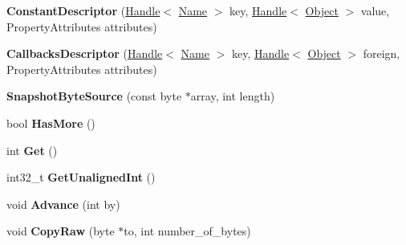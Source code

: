 \begin{DoxyCompactItemize}
\item 
\hypertarget{classv8_1_1internal_1_1_v8___f_i_n_a_l_ae0c2c99fa4e5b13e8497802393c25382}{}{\bfseries Constant\+Descriptor} (\hyperlink{classv8_1_1internal_1_1_handle}{Handle}$<$ \hyperlink{classv8_1_1internal_1_1_name}{Name} $>$ key, \hyperlink{classv8_1_1internal_1_1_handle}{Handle}$<$ \hyperlink{classv8_1_1internal_1_1_object}{Object} $>$ value, Property\+Attributes attributes)\label{classv8_1_1internal_1_1_v8___f_i_n_a_l_ae0c2c99fa4e5b13e8497802393c25382}

\item 
\hypertarget{classv8_1_1internal_1_1_v8___f_i_n_a_l_a8929d30570108eec8403c4b3769fb169}{}{\bfseries Callbacks\+Descriptor} (\hyperlink{classv8_1_1internal_1_1_handle}{Handle}$<$ \hyperlink{classv8_1_1internal_1_1_name}{Name} $>$ key, \hyperlink{classv8_1_1internal_1_1_handle}{Handle}$<$ \hyperlink{classv8_1_1internal_1_1_object}{Object} $>$ foreign, Property\+Attributes attributes)\label{classv8_1_1internal_1_1_v8___f_i_n_a_l_a8929d30570108eec8403c4b3769fb169}

\item 
\hypertarget{classv8_1_1internal_1_1_v8___f_i_n_a_l_ac03d52d5a58e6eed3687b1f0b4bb7bf4}{}{\bfseries Snapshot\+Byte\+Source} (const byte $\ast$array, int length)\label{classv8_1_1internal_1_1_v8___f_i_n_a_l_ac03d52d5a58e6eed3687b1f0b4bb7bf4}

\item 
\hypertarget{classv8_1_1internal_1_1_v8___f_i_n_a_l_a44c9dfeb037f593af8805ca84bb81e21}{}bool {\bfseries Has\+More} ()\label{classv8_1_1internal_1_1_v8___f_i_n_a_l_a44c9dfeb037f593af8805ca84bb81e21}

\item 
\hypertarget{classv8_1_1internal_1_1_v8___f_i_n_a_l_a38e2dba04c0b3f03de2b3e16279c947a}{}int {\bfseries Get} ()\label{classv8_1_1internal_1_1_v8___f_i_n_a_l_a38e2dba04c0b3f03de2b3e16279c947a}

\item 
\hypertarget{classv8_1_1internal_1_1_v8___f_i_n_a_l_adcbe2f6d8636b175551b90314a18fe2a}{}int32\+\_\+t {\bfseries Get\+Unaligned\+Int} ()\label{classv8_1_1internal_1_1_v8___f_i_n_a_l_adcbe2f6d8636b175551b90314a18fe2a}

\item 
\hypertarget{classv8_1_1internal_1_1_v8___f_i_n_a_l_a533e6c85b1ab19215e55b218e2be3793}{}void {\bfseries Advance} (int by)\label{classv8_1_1internal_1_1_v8___f_i_n_a_l_a533e6c85b1ab19215e55b218e2be3793}

\item 
\hypertarget{classv8_1_1internal_1_1_v8___f_i_n_a_l_ae8da8da33127403c3f5478dbad2ed74d}{}void {\bfseries Copy\+Raw} (byte $\ast$to, int number\+\_\+of\+\_\+bytes)\label{classv8_1_1internal_1_1_v8___f_i_n_a_l_ae8da8da33127403c3f5478dbad2ed74d}


\end{DoxyCompactItemize}
